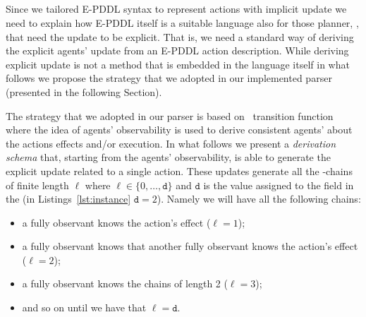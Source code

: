 \subsection{\impltoexpl}\label{subsec:expl}
Since we tailored E-PDDL syntax to represent actions with implicit \knobel update we need to explain how E-PDDL itself is a suitable language also for those planner, \eg \rpmep, that need the \knobel update to be explicit.
That is, we need a standard way of deriving the explicit agents' \knobel update from an E-PDDL action description.
While deriving explicit \knobel update is not a method that is embedded in the language itself in what follows we propose the strategy that we adopted in our implemented parser (presented in the following Section).

The strategy that we adopted in our parser is based on~\cite{baral2015action} transition function where the idea of agents' observability is used to derive consistent agents' \knobel about the actions effects and/or execution.
In what follows we present a \emph{\knobel derivation schema} that, starting from the agents' observability, is able to generate the explicit \knobel update related to a single action. These updates generate all the \knobel-chains of finite length $\ell$ where $\ell \in \{0,\dots,\mathtt{d}\}$ and  $\mathtt{d}$ is the value assigned to the field  in the \probinst (in Listings~\ref{lst:instance} $\mathtt{d} = 2$).
Namely we will have all the following chains:
\begin{itemize}
    \item a fully observant knows the action's effect ($\ell = 1$);
    \item a fully observant knows that another fully observant knows the action's effect ($\ell = 2$);
    \item a fully observant knows the chains of length 2 ($\ell = 3$);
    \item and so on until we have that $\ell = \mathtt{d}$.
\end{itemize}

